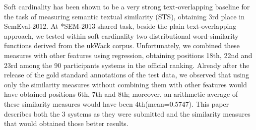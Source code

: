 Soft cardinality has been shown to be a very strong text-overlapping baseline for the task of measuring semantic textual similarity (STS), obtaining 3rd
 place in SemEval-2012. At *SEM-2013 shared task, beside the plain
 text-overlapping approach, we tested within soft cardinality two distributional
 word-similarity functions derived from the ukWack corpus. Unfortunately, we
 combined these measures with other features using regression, obtaining
 positions 18th, 22nd and 23rd among the 90 participants systems in the official
 ranking. Already after the release of the gold standard annotations of the test
 data, we observed that using only the similarity measures without combining
 them with other features would have obtained positions 6th, 7th and 8th;
 moreover, an arithmetic average of these similarity measures would have been
 4th(mean=0.5747). This paper describes both the 3 systems as they were
 submitted and the similarity measures that would obtained those better results.

